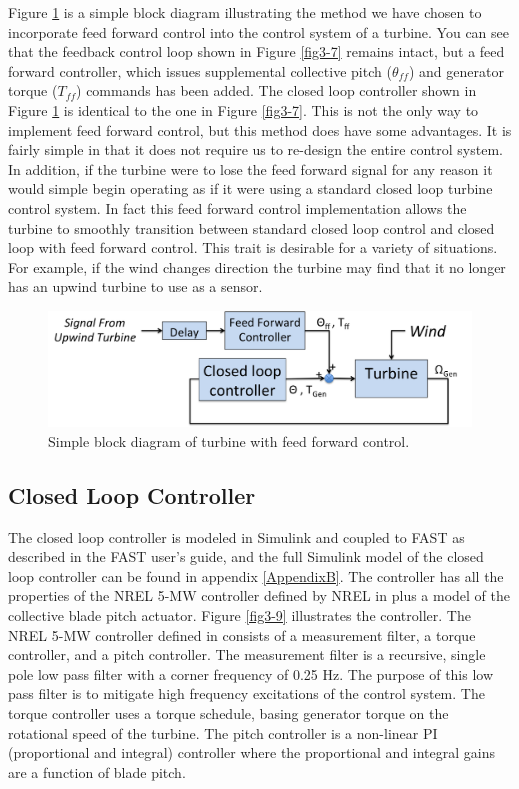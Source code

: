 Figure \ref{fig3-8} is a simple block diagram illustrating the method we have chosen  to incorporate feed forward control into the control system of a turbine. You can see that the feedback control loop shown in Figure \ref{fig3-7} remains intact, but a feed forward controller, which issues supplemental collective pitch ($\theta_{ff}$) and generator torque ($T_{ff}$) commands has been added. The closed loop controller shown in Figure \ref{fig3-8} is identical to the one in Figure \ref{fig3-7}. This is not the only way to implement feed forward control, but this method does have some advantages. It is fairly simple in that it does not require us to re-design the entire control system. In addition, if the turbine were to lose the feed forward signal for any reason it would simple begin operating as if it were using a standard closed loop turbine control system. In fact this feed forward control implementation allows the turbine to smoothly transition between standard closed loop control and closed loop with feed forward control. This trait is desirable for a variety of situations. For example, if the wind changes direction the turbine may find that it no longer has an upwind turbine to use as a sensor.

 \begin{figure}[htb]
	\centering
		\includegraphics[width=\linewidth]{Figures/ch3Figures/fig3-8.png}
		
	\caption{Simple block diagram of turbine with feed forward control.}
	\label{fig3-8}
\end{figure}

\subsection{Closed Loop Controller}

The closed loop controller is modeled in Simulink and coupled to FAST as described in the FAST user's guide\cite{jonkman2005}, and the full Simulink model of the closed loop controller can be found in appendix \ref{AppendixB}. The controller has all the properties of the NREL 5-MW controller defined by NREL in \cite{jonkman2009} plus a model of the collective blade pitch actuator.  Figure \ref{fig3-9} illustrates the controller. The NREL 5-MW controller defined in \cite{jonkman2009} consists of a measurement filter, a torque controller, and a pitch controller. The measurement filter is a recursive, single pole low pass filter with a corner frequency of 0.25 Hz. The purpose of this low pass filter is to mitigate high frequency excitations of the control system. The torque controller uses a torque schedule, basing generator torque on the rotational speed of the turbine. The pitch controller is a non-linear PI (proportional and integral) controller where the proportional and integral gains are a function of blade pitch. 

